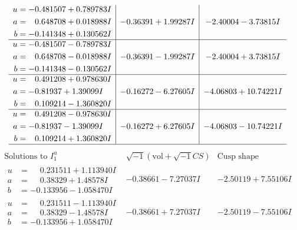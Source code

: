 \documentclass[1p]{elsarticle_modified}
\theoremstyle{definition}
\newcommand{\I}{\sqrt{-1}}
\begin{document}
$$\begin{array}{c|c|c}
\begin{aligned}
u &= -0.481507 + 0.789783 I \\
a &= \phantom{-}0.648708 + 0.018988 I \\
b &= -0.141348 + 0.130562 I\end{aligned}
 & -0.36391 + 1.99287 I & -2.40004 - 3.73815 I \\ \hline\begin{aligned}
u &= -0.481507 - 0.789783 I \\
a &= \phantom{-}0.648708 - 0.018988 I \\
b &= -0.141348 - 0.130562 I\end{aligned}
 & -0.36391 - 1.99287 I & -2.40004 + 3.73815 I \\ \hline\begin{aligned}
u &= \phantom{-}0.491208 + 0.978630 I \\
a &= -0.81937 + 1.39099 I \\
b &= \phantom{-}0.109214 - 1.360820 I\end{aligned}
 & -0.16272 - 6.27605 I & -4.06803 + 10.74221 I \\ \hline\begin{aligned}
u &= \phantom{-}0.491208 - 0.978630 I \\
a &= -0.81937 - 1.39099 I \\
b &= \phantom{-}0.109214 + 1.360820 I\end{aligned}
 & -0.16272 + 6.27605 I & -4.06803 - 10.74221 I\\
 \hline 
 \end{array}$$\newpage$$\begin{array}{c|c|c}  
\text{Solutions to }I^u_{1}& \I (\text{vol} + \sqrt{-1}CS) & \text{Cusp shape}\\
 \hline 
\begin{aligned}
u &= \phantom{-}0.231511 + 1.113940 I \\
a &= \phantom{-}0.38329 + 1.48578 I \\
b &= -0.133956 - 1.058470 I\end{aligned}
 & -0.38661 - 7.27037 I & -2.50119 + 7.55106 I \\ \hline\begin{aligned}
u &= \phantom{-}0.231511 - 1.113940 I \\
a &= \phantom{-}0.38329 - 1.48578 I \\
b &= -0.133956 + 1.058470 I\end{aligned}
 & -0.38661 + 7.27037 I & -2.50119 - 7.55106 I \\ \hline\begin{aligned}

\end{aligned}
\end{array}$$
\end{document}
